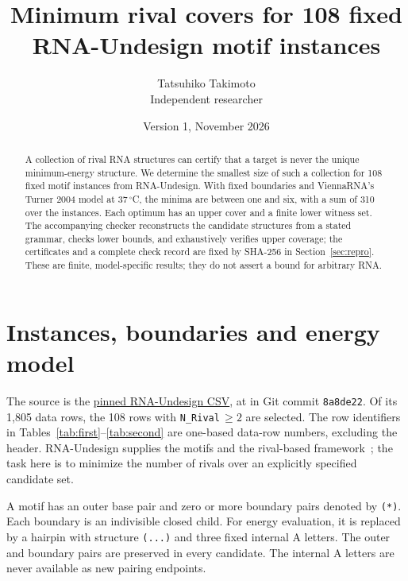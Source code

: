 \documentclass[10pt,a4paper]{article}
\title{Minimum rival covers for 108 fixed\\RNA-Undesign motif instances}
\author{Tatsuhiko Takimoto\\\small Independent researcher}
\date{Version 1, November 2026}
\begin{document}
\maketitle
\begin{abstract}
A collection of rival RNA structures can certify that a target is never the unique minimum-energy structure. We determine the smallest size of such a collection for 108 fixed motif instances from RNA-Undesign. With fixed boundaries and ViennaRNA's Turner 2004 model at 37\,$^\circ$C, the minima are between one and six, with a sum of 310 over the instances. Each optimum has an upper cover and a finite lower witness set. The accompanying checker reconstructs the candidate structures from a stated grammar, checks lower bounds, and exhaustively verifies upper coverage; the certificates and a complete check record are fixed by SHA-256 in Section~\ref{sec:repro}. These are finite, model-specific results; they do not assert a bound for arbitrary RNA.
\end{abstract}
\section{Instances, boundaries and energy model}
The source is the \href{https://raw.githubusercontent.com/shanry/RNA-Undesign/8a8de22/data/motifs_maxlen14_no_external/results.uniq.csv}{pinned RNA-Undesign CSV}, at  in Git commit \texttt{8a8de22}. Of its 1,805 data rows, the 108 rows with \texttt{N\_Rival}\,$\ge2$ are selected. The row identifiers in Tables~\ref{tab:first}--\ref{tab:second} are one-based data-row numbers, excluding the header. RNA-Undesign supplies the motifs and the rival-based framework~\cite{rigende,fastmotif}; the task here is to minimize the number of rivals over an explicitly specified candidate set.

A motif has an outer base pair and zero or more boundary pairs denoted by \texttt{(*)}. Each boundary is an indivisible closed child. For energy evaluation, it is replaced by a hairpin with structure \texttt{(...)} and three fixed internal A letters. The outer and boundary pairs are preserved in every candidate. The internal A letters are never available as new pairing endpoints.
\end{document}
